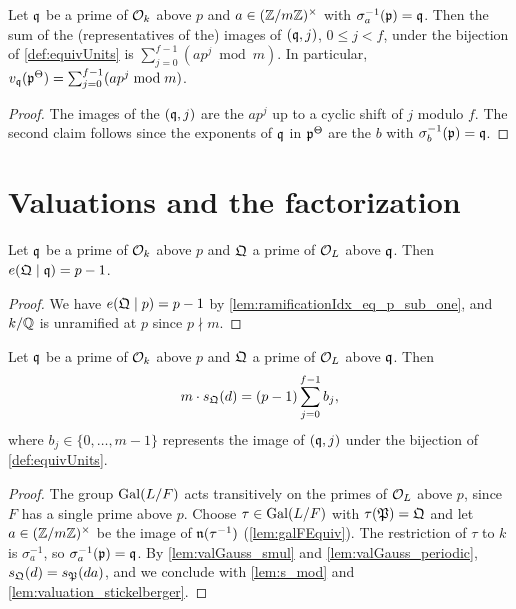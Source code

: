 \begin{lemma}
  \label{lem:valuation_stickelberger}
  \leanok
  Let $\mathfrak{q}$ be a prime of $\mathcal{O}_k$ above $p$ and $a \in (\mathbb{Z}/m\mathbb{Z})^\times$ with
  $\sigma_a^{-1}(\mathfrak{p}) = \mathfrak{q}$. Then the sum of the (representatives of the) images of
  $(\mathfrak{q}, j)$, $0 \leq j < f$, under the bijection of \ref{def:equivUnits} is
  $\sum_{j=0}^{f-1} (ap^j \bmod m)$. In particular,
  $v_{\mathfrak{q}}(\mathfrak{p}^{\Theta}) = \sum_{j=0}^{f-1} (ap^j \bmod m)$.
\end{lemma}

\begin{proof}
  \leanok
  The images of the $(\mathfrak{q}, j)$ are the $a p^j$ up to a cyclic shift of $j$ modulo $f$. The
  second claim follows since the exponents of $\mathfrak{q}$ in $\mathfrak{p}^{\Theta}$ are the $b$ with
  $\sigma_b^{-1}(\mathfrak{p}) = \mathfrak{q}$.
\end{proof}

\section{Valuations and the factorization}

\begin{lemma}
  \label{lem:ramificationIdx_eq_sub_one}
  \leanok
  Let $\mathfrak{q}$ be a prime of $\mathcal{O}_k$ above $p$ and $\mathfrak{Q}$ a prime of $\mathcal{O}_L$ above $\mathfrak{q}$. Then
  $e(\mathfrak{Q} \mid \mathfrak{q}) = p - 1$.
\end{lemma}

\begin{proof}
  \leanok
  We have $e(\mathfrak{Q} \mid p) = p - 1$ by \ref{lem:ramificationIdx_eq_p_sub_one}, and $k/\mathbb{Q}$ is
  unramified at $p$ since $p \nmid m$.
\end{proof}

\begin{lemma}
  \label{lem:valuation_gauss_sum_power}
  \leanok
  Let $\mathfrak{q}$ be a prime of $\mathcal{O}_k$ above $p$ and $\mathfrak{Q}$ a prime of $\mathcal{O}_L$ above $\mathfrak{q}$. Then
  \[
    m \cdot s_{\mathfrak{Q}}(d) = (p - 1) \sum_{j=0}^{f-1} b_j,
  \]
  where $b_j \in \{0, \ldots, m-1\}$ represents the image of $(\mathfrak{q}, j)$ under the bijection of
  \ref{def:equivUnits}.
\end{lemma}

\begin{proof}
  \leanok
  The group $\mathrm{Gal}(L/F)$ acts transitively on the primes of $\mathcal{O}_L$ above $p$, since $F$ has a
  single prime above $p$. Choose $\tau \in \mathrm{Gal}(L/F)$ with $\tau(\mathfrak{P}) = \mathfrak{Q}$ and let
  $a \in (\mathbb{Z}/m\mathbb{Z})^\times$ be the image of $\mathfrak{n}(\tau^{-1})$ (\ref{lem:galFEquiv}). The
  restriction of $\tau$ to $k$ is $\sigma_a^{-1}$, so $\sigma_a^{-1}(\mathfrak{p}) = \mathfrak{q}$. By
  \ref{lem:valGauss_smul} and \ref{lem:valGauss_periodic}, $s_{\mathfrak{Q}}(d) = s_{\mathfrak{P}}(da)$, and we
  conclude with \ref{lem:s_mod} and \ref{lem:valuation_stickelberger}.
\end{proof}

